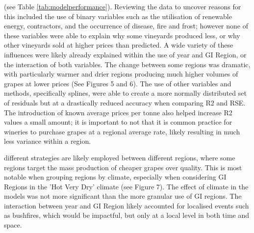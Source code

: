 \documentclass[review,12pt,authoryear]{elsarticle}
\begin{document}
\begin{linenumbers}
(see Table \ref*{tab:modelperformance}). 
%
 Reviewing the data to uncover reasons for this included the use of binary variables such as the utilisation of renewable energy, contractors, and the occurrence of disease, fire and frost; however none of these variables were able to explain why some vineyards produced less, or why other vineyards sold at higher prices than predicted. A wide variety of these influences were likely already explained within the use of year and GI Region, or the interaction of both variables. The change between some regions was dramatic, with particularly warmer and drier regions producing much higher volumes of grapes at lower prices (See Figures 5 and 6). The use of other variables and methods, specifically splines, were able to create a more normally distributed set of residuals but at a drastically reduced accuracy when comparing R2 and RSE. The introduction of known average prices per tonne also helped increase R2 values a small amount; it is important to not that it is common practice for wineries to purchase grapes at a regional average rate, likely resulting in much less variance within a region.

different strategies are likely employed between different regions, where some regions target the mass production of cheaper grapes over quality. This is most notable when grouping regions by climate, especially when considering GI Regions in the 'Hot Very Dry' climate (see Figure 7). The effect of climate in the models was not more significant than the more granular use of GI regions. The interaction between year and GI Region likely accounted for localised events such as bushfires, which would be impactful, but only at a local level in both time and space.


\end{linenumbers}
\end{document}
